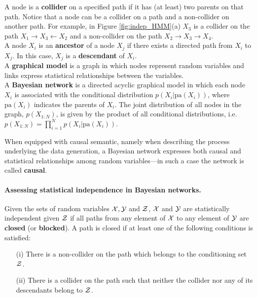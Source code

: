 A node is a {\bf collider} on a specified path if it has (at least) two parents on that path.
Notice that a node can be a collider on a path and a non-collider on another path. For example, in Figure \ref{fig:indep_HMM}(a) $X_3$ is a collider on the path $X_1 \rightarrow X_3 \leftarrow X_2$ and a non-collider on the path $X_2\rightarrow X_3\rightarrow X_4$.\\[5pt]
A node $X_i$ is an {\bf ancestor} of a node $X_j$ if there exists a directed path from $X_i$ to $X_j$. In this case, $X_j$ is a {\bf descendant} of $X_i$.\\[5pt]
A {\bf graphical model} is a graph in which nodes represent random variables and links express statistical relationships between the variables.\\[5pt]
A {\bf Bayesian network} is a directed acyclic graphical model in which each node $X_i$ is associated
with the conditional distribution $p(X_i|\text{pa}(X_i))$, where $\text{pa}(X_i)$ indicates the parents of $X_i$. The joint distribution of all nodes in
the graph, $p(X_{1:N})$, is given by the product of all conditional distributions, i.e. $p(X_{1:N})=\prod_{i=1}^Np(X_i|\text{pa}(X_i))$.

When equipped with causal semantic, namely when describing the process underlying the data generation, a Bayesian network expresses both causal and statistical relationships among random variables---in such a case the network is called {\bf causal}.  

\paragraph{Assessing statistical independence in Bayesian networks.}
Given the sets of random variables ${\cal X}, {\cal Y}$ and ${\cal Z}$,
${\cal X}$ and ${\cal Y}$ are statistically independent given ${\cal Z}$ if all paths
from any element of ${\cal X}$ to any element of ${\cal Y}$ are {\bf closed} (or {\bf blocked}). A path is closed if at least one of the following conditions is satisfied:
\begin{enumerate}
\setlength{\itemsep}{-2pt}  
\setlength{\parsep}{-4pt}
\item[(i)] There is a non-collider on the path which belongs to the conditioning set ${\cal Z}$.
\item[(ii)] There is a collider on the path such that neither the collider nor any of its descendants belong to ${\cal Z}$.
\end{enumerate}

